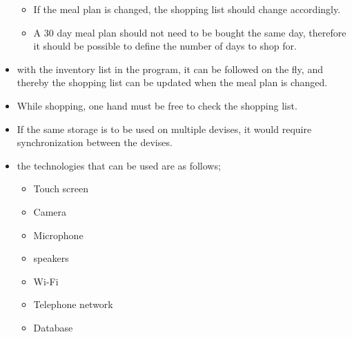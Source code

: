 \begin{itemize}
\begin{itemize}
    \item If the meal plan is changed, the shopping list should change accordingly.
    \item A 30 day meal plan should not need to be bought the same day, therefore it should be possible to define the number of days to shop for.    
  \end{itemize}
  \item with the inventory list in the program, it can be followed on the fly, and thereby the shopping list can be updated when the meal plan is changed.
  \item While shopping, one hand must be free to check the shopping list.
  \item If the same storage is to be used on multiple devises, it would require synchronization between the devises.
  \item the technologies that can be used are as follows;
  \begin{itemize}
    \item Touch screen
    \item Camera
    \item Microphone
    \item speakers
    \item Wi-Fi
    \item Telephone network
    \item Database
  \end{itemize}
\end{itemize}